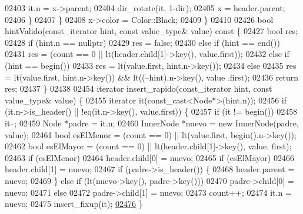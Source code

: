\begin{DoxyCode}
02403                 it.n = x->parent;
02404                 dir\_rotate(it, 1-dir);
02405                 x = header.parent;
02406             \}
02407         \}
02408         x->color = Color::Black;
02409     \}
02410 
02426     \textcolor{keywordtype}{bool} hintValido(const\_iterator hint, \textcolor{keyword}{const} value\_type& value)\textcolor{keyword}{ const }\{
02427         \textcolor{keywordtype}{bool} res;
02428         \textcolor{keywordflow}{if} (hint.n == \textcolor{keyword}{nullptr})
02429             res = \textcolor{keyword}{false};
02430         \textcolor{keywordflow}{else} \textcolor{keywordflow}{if} (hint == end())
02431             res = (count == 0 || lt(header.child[1]->key(), value.first));
02432         \textcolor{keywordflow}{else} \textcolor{keywordflow}{if} (hint == begin())
02433             res = lt(value.first, hint.n->key());
02434         \textcolor{keywordflow}{else}
02435             res = lt(value.first, hint.n->key()) && lt((--hint).n->key(), value
      .first);
02436         \textcolor{keywordflow}{return} res;
02437     \}
02438 
02454     iterator insert\_rapido(const\_iterator hint, \textcolor{keyword}{const} value\_type& value) \{
02455         iterator it(const\_cast<Node*>(hint.n));
02456         \textcolor{keywordflow}{if} (it.n->is\_header() || !eq(it.n->key(), value.first)) \{
02457             \textcolor{keywordflow}{if} (it != begin())
02458                 it--;
02459             Node *padre = it.n;
02460             InnerNode *nuevo = \textcolor{keyword}{new} InnerNode(padre, value);
02461             \textcolor{keywordtype}{bool} esElMenor = (count == 0) || lt(value.first, begin().n->key());
02462             \textcolor{keywordtype}{bool} esElMayor = (count == 0) || lt(header.child[1]->key(), value.
      first);
02463             \textcolor{keywordflow}{if} (esElMenor)
02464                 header.child[0] = nuevo;
02465             \textcolor{keywordflow}{if} (esElMayor)
02466                 header.child[1] = nuevo;
02467             \textcolor{keywordflow}{if} (padre->is\_header()) \{
02468                 header.parent = nuevo;
02469             \} \textcolor{keywordflow}{else} \textcolor{keywordflow}{if} (lt(nuevo->key(), padre->key()))
02470                 padre->child[0] = nuevo;
02471             \textcolor{keywordflow}{else}
02472                 padre->child[1] = nuevo;
02473             count++;
02474             it.n = nuevo;
02475             insert\_fixup(it);
\hypertarget{map_8h_source_l02476}{}\hyperlink{classaed2_1_1map_a98aadc6fb2ac8f51567a98473a90c30f_a98aadc6fb2ac8f51567a98473a90c30f}{02476}         \}

\end{DoxyCode}
